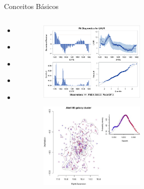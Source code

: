 \documentclass{bredelebeamer}
\begin{document}
\begin{frame}{Conceitos Básicos}

\begin{columns}
\begin{column}{0.5\textwidth}
\begin{flushleft}
\begin{itemize}
\item \textbf{}
\item \textbf{}
\item \textbf{}
\item \textbf{}
\item \textbf{}
\end{itemize}
\end{flushleft}
\end{column}

\begin{column}{0.5\textwidth}

\begin{figure}
\begin{flushleft}
  \includegraphics[width=0.5\textwidth]{images/modeldiag.png}
\end{flushleft}
\end{figure}

\begin{figure}
\begin{flushright}
    \includegraphics[width=0.5\textwidth]{images/galaxy_density_contours.jpg}
\end{flushright}
\end{figure}


\end{column}
\end{columns}
\end{frame}
\end{document}
